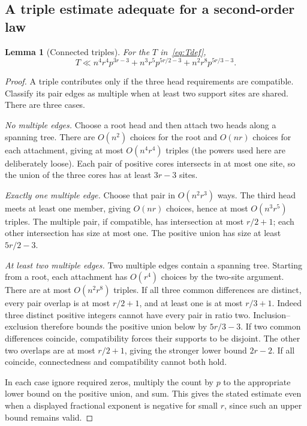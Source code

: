 \documentclass[11pt]{article}
\newtheorem{lemma}[theorem]{Lemma}
\theoremstyle{definition}\newtheorem{definition}[theorem]{Definition}
\theoremstyle{remark}\newtheorem{remark}[theorem]{Remark}
\begin{document}
\subsection{A triple estimate adequate for a second-order law}
\begin{lemma}[Connected triples]\label{lem:triples}
For the $T$ in~\eqref{eq:Tdef},
\begin{equation}
 T\ll n^4r^4p^{3r-3}
       +n^3r^5p^{5r/2-3}
       +n^2r^8p^{5r/3-3}.\label{eq:triplebound}
\end{equation}
\end{lemma}
\begin{proof}
A triple contributes only if the three head requirements are compatible.
Classify its pair edges as multiple when at least two support sites are
shared. There are three cases.

\emph{No multiple edges.} Choose a root head and then attach two heads
along a spanning tree. There are $O(n^2)$ choices for the root and
$O(nr)$ choices for each attachment, giving at most $O(n^4r^4)$ triples
(the powers used here are deliberately loose). Each pair of positive
cores intersects in at most one site, so the union of the three cores
has at least $3r-3$ sites.

\emph{Exactly one multiple edge.} Choose that pair in $O(n^2r^3)$ ways.
The third head meets at least one member, giving $O(nr)$ choices, hence
at most $O(n^3r^5)$ triples. The multiple pair, if compatible, has
intersection at most $r/2+1$; each other intersection has size at most
one. The positive union has size at least $5r/2-3$.

\emph{At least two multiple edges.} Two multiple edges contain a spanning
tree. Starting from a root, each attachment has $O(r^4)$ choices by the
two-site argument. There are at most $O(n^2r^8)$ triples.
If all three common differences are distinct, every pair overlap is at
most $r/2+1$, and at least one is at most $r/3+1$. Indeed three distinct
positive integers cannot have every pair in ratio two. Inclusion--exclusion
therefore bounds the positive union below by $5r/3-3$.
If two common differences coincide, compatibility forces their supports
to be disjoint. The other two overlaps are at most $r/2+1$, giving the
stronger lower bound $2r-2$. If all coincide, connectedness and
compatibility cannot both hold.

In each case ignore required zeros, multiply the count by $p$ to the
appropriate lower bound on the positive union, and sum. This gives the
stated estimate even when a displayed fractional exponent is negative
for small $r$, since such an upper bound remains valid.
\end{proof}
\end{document}

